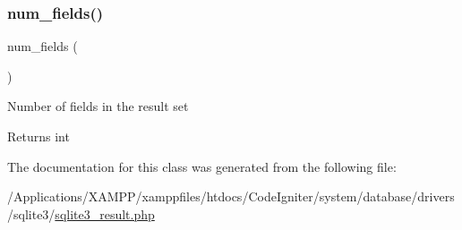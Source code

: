 \subsubsection{\texorpdfstring{num\+\_\+fields()}{num\_fields()}}
{\footnotesize\ttfamily num\+\_\+fields (\begin{DoxyParamCaption}{ }\end{DoxyParamCaption})}

Number of fields in the result set

\begin{DoxyReturn}{Returns}
int 
\end{DoxyReturn}


The documentation for this class was generated from the following file\+:\begin{DoxyCompactItemize}
\item 
/\+Applications/\+X\+A\+M\+P\+P/xamppfiles/htdocs/\+Code\+Igniter/system/database/drivers/sqlite3/\mbox{\hyperlink{sqlite3__result_8php}{sqlite3\+\_\+result.\+php}}\end{DoxyCompactItemize}

